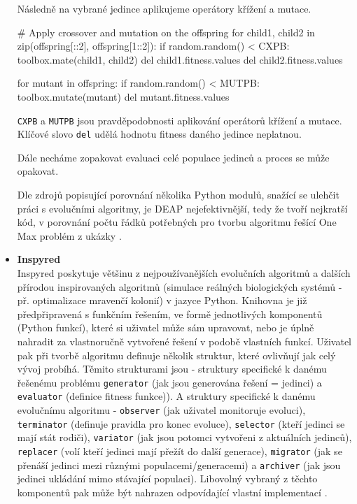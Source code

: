 \begin{itemize}
        Následně na vybrané jedince aplikujeme operátory křížení a mutace.
\begin{code}
    # Apply crossover and mutation on the offspring
    for child1, child2 in zip(offspring[::2], offspring[1::2]):
        if random.random() < CXPB:
            toolbox.mate(child1, child2)
            del child1.fitness.values
            del child2.fitness.values

    for mutant in offspring:
        if random.random() < MUTPB:
            toolbox.mutate(mutant)
            del mutant.fitness.values
\end{code}
        \texttt{CXPB} a \texttt{MUTPB} jsou pravděpodobnosti aplikování operátorů
        křížení a mutace. Klíčové slovo \texttt{del} udělá hodnotu fitness
        daného jedince neplatnou.

        Dále necháme zopakovat evaluaci celé populace jedinců a proces se může
        opakovat.
        
        Dle zdrojů popisující porovnání několika Python modulů, snažící se
        ulehčit práci s evolučními algoritmy, je DEAP nejefektivnější, tedy že 
        tvoří nejkratší kód, v porovnání počtu řádků potřebných pro tvorbu
        algoritmu řešící One Max problém z ukázky \citep{fortin2012deap}.

    \item \textbf{Inspyred}\\
        Inspyred poskytuje většinu z nejpoužívanějších evolučních algoritmů a
        dalších přírodou inspirovaných algoritmů (simulace reálných
        biologických systémů - př. optimalizace mravenčí kolonií) v jazyce
        Python. Knihovna je již předpřipravená s funkčním řešením, ve formě
        jednotlivých komponentů (Python funkcí), které si uživatel může sám
        upravovat, nebo je úplně nahradit za vlastnoručně vytvořené řešení v
        podobě vlastních funkcí. Uživatel pak při tvorbě algoritmu definuje
        několik struktur, které ovlivňují jak celý vývoj probíhá. Těmito
        strukturami jsou - struktury specifické k danému řešenému problému
        \texttt{generator} (jak jsou generována řešení = jedinci) a
        \texttt{evaluator} (definice fitness funkce)). A struktury specifické k
        danému evolučnímu algoritmu - \texttt{observer} (jak uživatel
        monitoruje evoluci), \texttt{terminator} (definuje pravidla pro konec
        evoluce), \texttt{selector} (kteří jedinci se mají stát rodiči),
        \texttt{variator} (jak jsou potomci vytvořeni z aktuálních jedinců),
        \texttt{replacer} (volí kteří jedinci mají přežít do další generace),
        \texttt{migrator} (jak se přenáší jedinci mezi různými
        populacemi/generacemi) a \texttt{archiver} (jak jsou jedinci ukládání
        mimo stávající populaci). Libovolný vybraný z těchto komponentů pak může být
        nahrazen odpovídající vlastní implementací \citep{tonda2020inspyred}.

\end{itemize}

